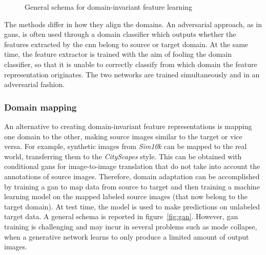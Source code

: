 \documentclass[%
    corpo=12pt,
    twoside,
    stile=classica,   
    tipotesi=magistrale,
    evenboxes,
    english,
	numerazioneromana,
]{toptesi}
\begin{document}
\begin{figure}[ht]
	\centering
	\caption{General schema for domain-invariant feature learning\cite{wilson2020survey}}
	\label{fig:align}
\end{figure}

The methods differ in how they align the domains. An adversarial approach, as in \glspl{gan}, is often used through a domain classifier which outputs whether the features extracted by the \gls{cnn} belong to source or target domain. At the same time, the feature extractor is trained with the aim of fooling the domain classifier, so that it is unable to correctly classify from which domain the feature representation originates. The two networks are trained simultaneously and in an adversarial fashion.

\subsubsection{Domain mapping}
An alternative to creating domain-invariant feature representations is mapping one domain to the other, making source images similar to the target or vice versa. For example, synthetic images from \textit{Sim10k} can be mapped to the real world, transferring them to the \textit{CityScapes} style. This can be obtained with conditional \glspl{gan} for image-to-image translation that do not take into account the annotations of source images. Therefore, domain adaptation can be accomplished by training a \gls{gan} to map data from source to target and then training a machine learning model on the mapped labeled source images (that now belong to the target domain). At test time, the model is used to make predictions on unlabeled target data. A general schema is reported in figure~\ref{fig:gan}. However, \gls{gan} training is challenging and may incur in several problems such as mode collapse, when a generative network learns to only produce a limited amount of output images.
\end{document}
